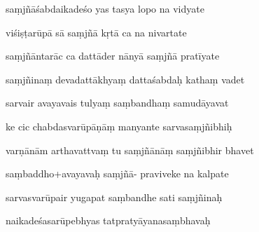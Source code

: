 \documentclass[article,12pt,a4paper]{memoir}%
\newcounter{parCount}
\begin{document}
	  
	  \pstart {} saṃjñāśabdaikadeśo yas tasya lopo na vidyate 
	{}
	\pend%
      

	  
	  \pstart \leavevmode%
	viśiṣṭarūpā sā saṃjñā kṛtā ca na nivartate 
	{}
	\pend%
      

	  
	  \pstart {} saṃjñāntarāc ca dattāder nānyā saṃjñā pratīyate 
	{}
	\pend%
      

	  
	  \pstart \leavevmode%
	saṃjñinaṃ devadattākhyaṃ dattaśabdaḥ kathaṃ vadet 
	{}
	\pend%
      

	  
	  \pstart {} sarvair avayavais tulyaṃ saṃbandhaṃ samudāyavat 
	{}
	\pend%
      

	  
	  \pstart \leavevmode%
	ke cic chabdasvarūpāṇāṃ manyante sarvasaṃjñibhiḥ 
	{}
	\pend%
      

	  
	  \pstart {} varṇānām arthavattvaṃ tu saṃjñānāṃ saṃjñibhir bhavet 
	{}
	\pend%
      

	  
	  \pstart \leavevmode%
	saṃbaddho+avayavaḥ saṃjñā- praviveke na kalpate 
	{}
	\pend%
      

	  
	  \pstart {} sarvasvarūpair yugapat saṃbandhe sati saṃjñinaḥ 
	{}
	\pend%
      

	  
	  \pstart \leavevmode%
	naikadeśasarūpebhyas tatpratyāyanasaṃbhavaḥ 
	{}
	\pend%
      
\end{document}

